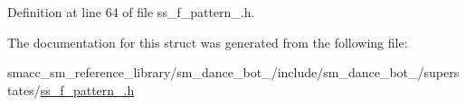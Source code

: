 Definition at line 64 of file ss\+\_\+f\+\_\+pattern\+\_.\+h.



The documentation for this struct was generated from the following file\+:\begin{DoxyCompactItemize}
\item 
smacc\+\_\+sm\+\_\+reference\+\_\+library/sm\+\_\+dance\+\_\+bot\+\_/include/sm\+\_\+dance\+\_\+bot\+\_/superstates/\hyperlink{3_2include_2sm__dance__bot__3_2superstates_2ss__f__pattern__1_8h}{ss\+\_\+f\+\_\+pattern\+\_.\+h}\end{DoxyCompactItemize}

